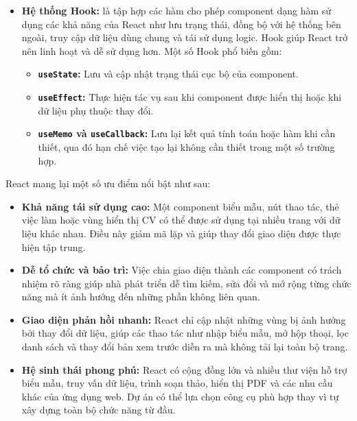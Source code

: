 \begin{itemize}
    \item \textbf{Hệ thống Hook:} là tập hợp các hàm cho phép component dạng hàm sử dụng các khả năng của React như lưu trạng thái, đồng bộ với hệ thống bên ngoài, truy cập dữ liệu dùng chung và tái sử dụng logic. Hook giúp React trở nên linh hoạt và dễ sử dụng hơn. Một số Hook phổ biến gồm:
    \begin{itemize}
        \item \textbf{\texttt{useState}:} Lưu và cập nhật trạng thái cục bộ của component.

        \item \textbf{\texttt{useEffect}:} Thực hiện tác vụ sau khi component được hiển thị hoặc khi dữ liệu phụ thuộc thay đổi.

        \item \textbf{\texttt{useMemo} và \texttt{useCallback}:} Lưu lại kết quả tính toán hoặc hàm khi cần thiết, qua đó hạn chế việc tạo lại không cần thiết trong một số trường hợp.
    \end{itemize}
\end{itemize}

React mang lại một số ưu điểm nổi bật như sau:

\begin{itemize}
    \item \textbf{Khả năng tái sử dụng cao:} Một component biểu mẫu, nút thao tác, thẻ việc làm hoặc vùng hiển thị CV có thể được sử dụng tại nhiều trang với dữ liệu khác nhau. Điều này giảm mã lặp và giúp thay đổi giao diện được thực hiện tập trung.

    \item \textbf{Dễ tổ chức và bảo trì:} Việc chia giao diện thành các component có trách nhiệm rõ ràng giúp nhà phát triển dễ tìm kiếm, sửa đổi và mở rộng từng chức năng mà ít ảnh hưởng đến những phần không liên quan.

    \item \textbf{Giao diện phản hồi nhanh:} React chỉ cập nhật những vùng bị ảnh hưởng bởi thay đổi dữ liệu, giúp các thao tác như nhập biểu mẫu, mở hộp thoại, lọc danh sách và thay đổi bản xem trước diễn ra mà không tải lại toàn bộ trang.

    \item \textbf{Hệ sinh thái phong phú:} React có cộng đồng lớn và nhiều thư viện hỗ trợ biểu mẫu, truy vấn dữ liệu, trình soạn thảo, hiển thị PDF và các nhu cầu khác của ứng dụng web. Dự án có thể lựa chọn công cụ phù hợp thay vì tự xây dựng toàn bộ chức năng từ đầu.
\end{itemize}

